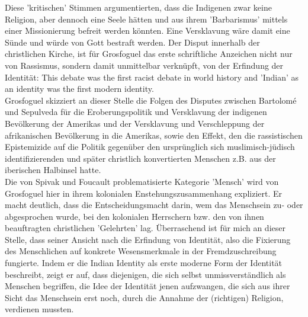 Diese 'kritischen' Stimmen argumentierten, dass die Indigenen zwar keine
Religion, aber dennoch eine Seele hätten und aus ihrem 'Barbarismus' mittels
einer Missionierung befreit werden könnten. \footnotemark {}
Eine Versklavung wäre damit eine
Sünde und würde von Gott bestraft werden. Der Disput innerhalb der christlichen
Kirche, ist für Grosfoguel das erste schriftliche Anzeichen nicht nur von
Rassismus, sondern damit unmittelbar verknüpft, von der Erfindung der
Identität: \glqq This debate was the first racist debate in world history and
'Indian' as an identity was the first modern identity. \grqq \footnotemark
{} \\
Grosfoguel skizziert an dieser Stelle
die Folgen des Disputes zwischen Bartolomé und Sepulveda für die
Eroberungspolitik und Versklavung der indigenen Bevölkerung der Amerikas und
der Versklavung und Verschleppung der afrikanischen Bevölkerung in die
Amerikas, sowie den Effekt, den die rassistischen Epistemizide auf die Politik
gegenüber den ursprünglich sich muslimisch-jüdisch identifizierenden und später
christlich konvertierten Menschen z.B. aus der iberischen Halbinsel
hatte.\footnotemark {} \\

Die von Spivak und Foucault
problematisierte Kategorie 'Mensch' wird von Grosfoguel hier in ihrem
kolonialen Enstehungszusammenhang expliziert. Er macht deutlich, dass die
Entscheidungsmacht darin, wem das Menschsein zu- oder abgesprochen wurde, bei
den kolonialen Herrschern bzw. den von ihnen beauftragten christlichen
'Gelehrten' lag. Überraschend ist für mich an dieser Stelle, dass seiner
Ansicht nach die Erfindung von Identität, also die Fixierung des Menschlichen
auf konkrete Wesensmerkmale in der Fremdzuschreibung fungierte. Indem er die
\glqq Indian Identity \grqq als erste moderne Form der Identität beschreibt, zeigt er
auf, dass diejenigen, die sich selbst unmissverständlich als Menschen
begriffen, die Idee der Identität jenen aufzwangen, die sich aus ihrer Sicht
das Menschsein erst noch, durch die Annahme der (richtigen) Religion, verdienen
mussten. 
\\

